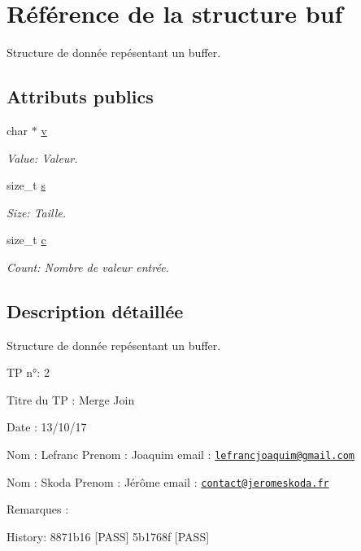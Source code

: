 \hypertarget{structbuf}{}\section{Référence de la structure buf}
\label{structbuf}


Structure de donnée repésentant un buffer.  


\subsection*{Attributs publics}
\begin{DoxyCompactItemize}
\item 
char $\ast$ \hyperlink{structbuf_a0690d33ca270683cb07fd9a1b9f4dd68}{v}
\begin{DoxyCompactList}\small\item\em Value\+: Valeur. \end{DoxyCompactList}\item 
size\+\_\+t \hyperlink{structbuf_aae0f7f61347b29fa0088cbf7d952b14c}{s}
\begin{DoxyCompactList}\small\item\em Size\+: Taille. \end{DoxyCompactList}\item 
size\+\_\+t \hyperlink{structbuf_a37cf76bb775bf17b3e7566e0611428e6}{c}
\begin{DoxyCompactList}\small\item\em Count\+: Nombre de valeur entrée. \end{DoxyCompactList}\end{DoxyCompactItemize}


\subsection{Description détaillée}
Structure de donnée repésentant un buffer. 

TP n°\+: 2

Titre du TP \+: Merge Join

Date \+: 13/10/17

Nom \+: Lefranc Prenom \+: Joaquim email \+: \href{mailto:lefrancjoaquim@gmail.com}{\tt lefrancjoaquim@gmail.\+com}

Nom \+: Skoda Prenom \+: Jérôme email \+: \href{mailto:contact@jeromeskoda.fr}{\tt contact@jeromeskoda.\+fr}

Remarques \+:

History\+: 8871b16 \mbox{[}P\+A\+SS\mbox{]} 5b1768f \mbox{[}P\+A\+SS\mbox{]} 


